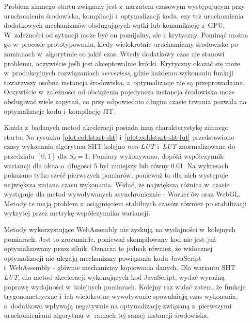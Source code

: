 Problem zimnego startu związany jest z~narzutem czasowym występującym przy uruchomieniu środowiska, kompilacji i~optymalizacji kodu, czy też uruchomienia dodatkowych mechanizmów obsługujących wątki lub komunikację z~GPU. W~zależności od sytuacji może być on pomijalny, ale i~krytyczny. Pominąć można go w~procesie prototypowania, kiedy wielokrotnie uruchamiamy środowisko po zamianach w~algorytmie co jakiś czas. Wtedy dodatkowy czas nie stanowi problemu, oczywiście jeśli jest akceptowalnie krótki. Krytyczny okazać się może w~produkcyjnych rozwiązaniach \textit{serverless}, gdzie każdemu wykonaniu funkcji towarzyszy osobna instancja środowiska, a~optymalizacje nie są przeprowadzane. Oczywiście w~zależności od obciążenia pojedyncza instancja środowiska może obsługiwać wiele zapytań, co przy odpowiednio długim czasie trwania pozwala na optymalizację kodu i~kompilację JIT.

Każda z~badanych metod akceleracji posiada inną charakterystykę zimnego startu. Na rysunku \ref{plot:coldstart-sht} i~\ref{plot:coldstart-sht-lut} przedstawiono czasy wykonania algorytmu SHT kolejno \textit{non-LUT} i~\textit{LUT} znormalizowane do przedziału $\left[0, 1\right]$ dla $S_\theta=1$. Pomiary wykonywano, dopóki współczynnik wariancji dla okna o~długości 5 był mniejszy lub równy 0.01. Na wykresach pokazano tylko sześć pierwszych pomiarów, ponieważ to dla nich występuje największa zmiana czasu wykonania. Widać, że największa różnica w~czasie występuje dla metod wywoływanych asynchronicznie - Worker'ów oraz WebGL. Metody te mają problem z~osiągnięciem stabilnych czasów również po stabilizacji wykrytej przez metrykę współczynnika wariancji.

Metody wykorzystujące WebAssembly nie zyskują na wydajności w~kolejnych pomiarach. Jest to zrozumiałe, ponieważ skompilowany kod nie jest już optymalizowany przez silnik. Oznacza to jednak również, że widocznej optymalizacji nie ulegają mechanizmy powiązania kodu JavaScript i~WebAssembly - głównie mechanizmy kopiowania danych. Dla wariantu SHT \textit{LUT}, dla metod akceleracji wykonujących kod JavaScript, wydać wyraźną poprawę wydajności w~kolejnych pomiarach. Kolejny raz widać zatem, że funkcje trygonometryczne i~ich wielokrotne wywoływanie spowalniają czas wykonania, a~dodatkowo wpływają negatywnie na optymalizację związaną z~pierwszymi uruchomieniami algorytmu w~ramach tej samej instancji środowiska.





